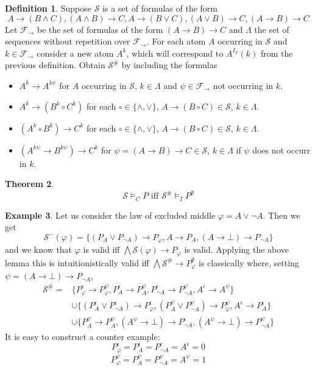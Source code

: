 \documentclass[a4paper,12pt]{report}
\theoremstyle{definition}
\newtheorem{theorem}{Theorem}[section]
\theoremstyle{definition}
\theoremstyle{definition}
\theoremstyle{definition}
\theoremstyle{definition}
\newtheorem{definition}[theorem]{Definition}
\theoremstyle{definition}
\newtheorem{example}[theorem]{Example}
\theoremstyle{definition}
\begin{document}
	\begin{definition}
		Suppose $\mathcal S$ is a set of formulas of the form
		$$A\to (B\wedge C), (A\wedge B)\to C, A\to (B\vee C),(A\vee B)\to C, (A\to B)\to C$$
		Let $\mathcal F_\to$ be the set of formulas of the form $(A\to B)\to C$ and $\Lambda$ the set of sequences without repetition over $\mathcal F_\to$. For each atom $A$ occurring in $\mathcal S$ and $k\in \mathcal F_\to$ consider a new atom $A^{k}$, which will correspond to $A^{I_F}(k)$ from the previous definition. Obtain $\mathcal S^\#$ by including the formulas
		\begin{itemize}
			\item $A^k\to A^{k\psi}$ for $A$ occurring in $\mathcal S$, $k\in\Lambda$ and $\psi\in\mathcal F_\to$ not occurring in $k$.
			\item $A^k\to (B^k\circ C^k)$ for each $\circ\in\{\wedge,\vee\}$, $A\to (B\circ C)\in\mathcal S$, $k\in\Lambda$.
			\item $(A^k\circ B^k)\to C^k$ for each $\circ\in\{\wedge,\vee\}$, $A\to (B\circ C)\in\mathcal S$, $k\in\Lambda$.
			\item $(A^{k\psi}\to B^{k\psi})\to C^k$ for $\psi = (A\to B)\to C\in\mathcal S$, $k\in\Lambda$ if $\psi$ does not occurr in $k$.
		\end{itemize}
	\end{definition}

	\begin{theorem}
		$$\mathcal S\models_C P\text{ iff }\mathcal S^\#\models_I P^\emptyset$$
	\end{theorem}

	\begin{example}
		Let us consider the law of excluded middle $\varphi = A\vee\neg A$. Then we get
		$$\mathcal S^-(\varphi) = \{(P_A\vee P_{\neg A})\to P_\varphi, A\to P_A, (A\to \bot)\to P_{\neg A}\}$$
		and we know that $\varphi$ is valid iff $\bigwedge \mathcal S(\varphi)\to P_\varphi$ is valid. Applying the above lemma this is intuitionistically valid iff $\bigwedge\mathcal S^\#\to P^\emptyset_\varphi$ is classically where, setting $\psi = (A\to \bot)\to P_{\neg A}$,
		\begin{align*}
			\mathcal S^\# =&\{P_\varphi^\epsilon\to P_\varphi^{\psi}, P_A^\epsilon\to P_A^{\psi},P_{\neg A}^\epsilon\to P_{\neg A}^{\psi},A^\epsilon\to A^{\psi}\}\\ &\cup\{(P_A^\epsilon\vee P_{\neg A}^\epsilon)\to P_\varphi^\epsilon, (P_A^{\psi}\vee P_{\neg A}^{\psi})\to P_\varphi^{\psi},  A^\epsilon\to P_A^\epsilon\}\\ &\cup \{P_A^{\psi}\to P_A^{\psi}, (A^{\psi}\to \bot)\to P_{\neg A}^\epsilon, (A^{\psi}\to \bot)\to P_{\neg A}^{\psi}\}
		\end{align*}
		It is easy to construct a counter example:
		$$P_\varphi^\epsilon  = P_A^\epsilon = P_{\neg A}^\epsilon = A^\epsilon = 0$$
		$$P_{\varphi}^{\psi} = P_A^{\psi} =  P_{\neg A}^{\psi} = A^{\psi} = 1$$
	\end{example}	
\end{document}
